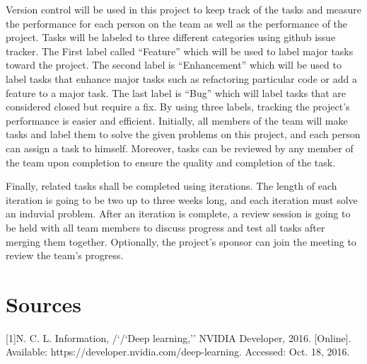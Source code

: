 \documentclass[letterpaper,10pt]{article}
\newcommand{\doublequotes}[1]{``#1''}
\begin{document}
Version control will be used in this project to keep track of the tasks and measure the performance for each person on the team as well as the performance of the project.
 Tasks will be labeled to three different categories using github issue tracker.
 The First label called \doublequotes{Feature} which will be used to label major tasks toward the project.
 The second label is \doublequotes{Enhancement} which will be used to label tasks that enhance major tasks such as refactoring particular code or add a feature to a major task.
 The last label is \doublequotes{Bug} which will label tasks that are considered closed but require a fix.
 By using three labels, tracking the project’s performance is easier and efficient.
 Initially, all members of the team will make tasks and label them to solve the given problems on this project, and each person can assign a task to himself.
 Moreover, tasks can be reviewed by any member of the team upon completion to ensure the quality and completion of the task.


Finally, related tasks shall be completed using iterations.
 The length of each iteration is going to be two up to three weeks long, and each iteration must solve an induvial problem.
 After an iteration is complete, a review session is going to be held with all team members to discuss progress and test all tasks after merging them together.
 Optionally, the project’s sponsor can join the meeting to review the team's progress.


\section{Sources}

[1]N. C. L. Information, /`/`Deep learning,'' NVIDIA Developer, 2016. [Online]. Available: https://developer.nvidia.com/deep-learning. Accessed: Oct. 18, 2016.
\end{document}
